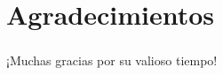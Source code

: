 \section*{Agradecimientos}

\begin{frame}
	\frametitle{\secname}

	\begin{center}\Large
		¡Muchas gracias por su valioso tiempo!
	\end{center}
\end{frame}
